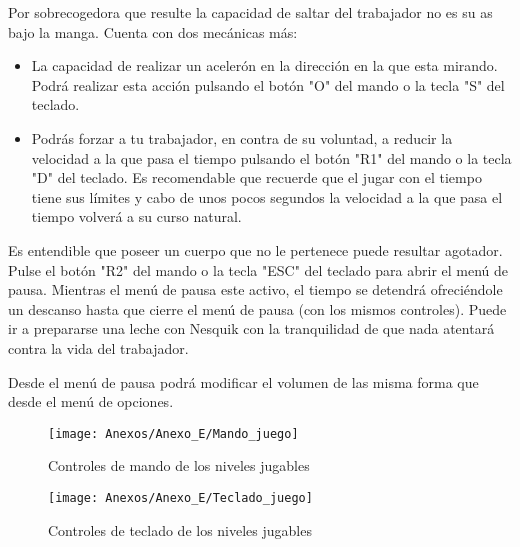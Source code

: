 Por sobrecogedora que resulte la capacidad de saltar del \textcolor{azulWorker}{trabajador} no es su as bajo la manga. Cuenta con dos mecánicas más:
\begin{itemize}
\item
La capacidad de realizar un acelerón en la dirección en la que esta mirando. Podrá realizar esta acción pulsando el botón "O" del mando o la tecla "S" del teclado.
\item
Podrás forzar a tu \textcolor{azulWorker}{trabajador}, en contra de su voluntad, a reducir la velocidad a la que pasa el tiempo pulsando el botón "R1" del mando o la tecla "D" del teclado. Es recomendable que recuerde que el jugar con el tiempo tiene sus límites y cabo de unos pocos segundos la velocidad a la que pasa el tiempo volverá a su curso natural.
\end{itemize}


Es entendible que poseer un cuerpo que no le pertenece puede resultar agotador. Pulse el botón "R2" del mando o la tecla "ESC" del teclado para abrir el menú de pausa. Mientras el menú de pausa este activo, el tiempo se detendrá ofreciéndole un descanso hasta que cierre el menú de pausa (con los mismos controles). Puede ir a prepararse una leche con Nesquik con la tranquilidad de que nada atentará contra la vida del \textcolor{azulWorker}{trabajador}.

Desde el menú de pausa podrá modificar el volumen de las misma forma que desde el menú de opciones.

\begin{figure}[h]
\centering
\texttt{[image: Anexos/Anexo\_E/Mando\_juego]}
\caption{Controles de mando de los niveles jugables}
\end{figure}

\begin{figure}[h]
\centering
\texttt{[image: Anexos/Anexo\_E/Teclado\_juego]}
\caption{Controles de teclado de los niveles jugables}
\end{figure}